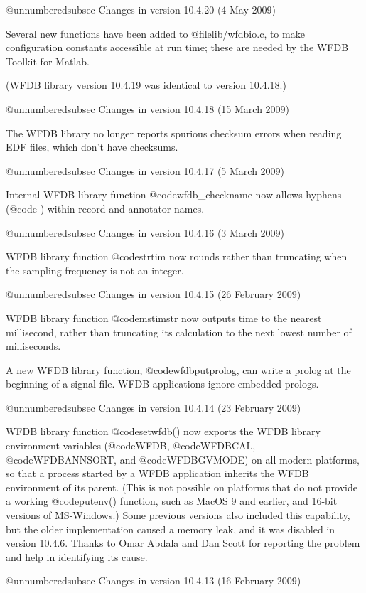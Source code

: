 {{{{{{{{@unnumberedsubsec Changes in version 10.4.20 (4 May 2009)

Several new functions have been added to @file{lib/wfdbio.c}, to make
configuration constants accessible at run time; these are needed by
the WFDB Toolkit for Matlab.

(WFDB library version 10.4.19 was identical to version 10.4.18.)

@unnumberedsubsec Changes in version 10.4.18 (15 March 2009)

The WFDB library no longer reports spurious checksum errors when reading
EDF files, which don't have checksums.

@unnumberedsubsec Changes in version 10.4.17 (5 March 2009)

Internal WFDB library function @code{wfdb_checkname} now allows hyphens
(@code{-}) within record and annotator names.

@unnumberedsubsec Changes in version 10.4.16 (3 March 2009)

WFDB library function @code{strtim} now rounds rather than truncating when
the sampling frequency is not an integer.

@unnumberedsubsec Changes in version 10.4.15 (26 February 2009)

WFDB library function @code{mstimstr} now outputs time to the nearest
millisecond, rather than truncating its calculation to the next lowest number
of milliseconds.

A new WFDB library function, @code{wfdbputprolog}, can write a prolog at the
beginning of a signal file.  WFDB applications ignore embedded prologs.

@unnumberedsubsec Changes in version 10.4.14 (23 February 2009)

WFDB library function @code{setwfdb()} now exports the WFDB library
environment variables (@code{WFDB}, @code{WFDBCAL},
@code{WFDBANNSORT,} and @code{WFDBGVMODE}) on all modern platforms, so
that a process started by a WFDB application inherits the WFDB
environment of its parent.  (This is not possible on platforms that do
not provide a working @code{putenv()} function, such as MacOS 9 and
earlier, and 16-bit versions of MS-Windows.)  Some previous versions
also included this capability, but the older implementation caused a
memory leak, and it was disabled in version 10.4.6.  Thanks to Omar
Abdala and Dan Scott for reporting the problem and help in identifying
its cause.

@unnumberedsubsec Changes in version 10.4.13 (16 February 2009)

}}}}}}}}
